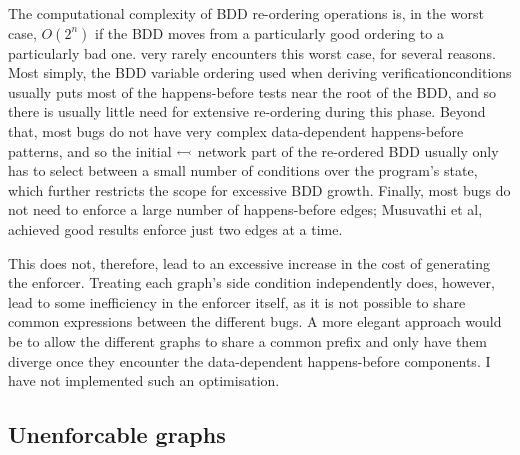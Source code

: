 The computational complexity of BDD re-ordering operations is, in the
worst case, $O(2^n)$ if the BDD moves from a particularly good
ordering to a particularly bad one.  {\Technique} very rarely
encounters this worst case, for several reasons.  Most simply, the BDD
variable ordering used when deriving \glspl{verificationcondition}
usually puts most of the happens-before tests near the root of the
BDD, and so there is usually little need for extensive re-ordering
during this phase.  Beyond that, most bugs do not have very complex
data-dependent happens-before patterns, and so the initial
$\leftarrowtail$ network part of the re-ordered BDD usually only
has to select between a small number of conditions over the program's
state, which further restricts the scope for excessive BDD growth.
Finally, most bugs do not need to enforce a large number of
happens-before edges; Musuvathi et al\cite{Musuvathi2007}, achieved
good results enforce just two edges at a time.

This does not, therefore, lead to an excessive increase in the cost of
generating the enforcer.  Treating each graph's side condition
independently does, however, lead to some inefficiency in the enforcer
itself, as it is not possible to share common expressions between the
different bugs.  A more elegant approach would be to allow the
different graphs to share a common prefix and only have them diverge
once they encounter the data-dependent happens-before components.  I
have not implemented such an optimisation.

\subsection{Unenforcable graphs}
\label{sect:reproduce:unenforcable}

